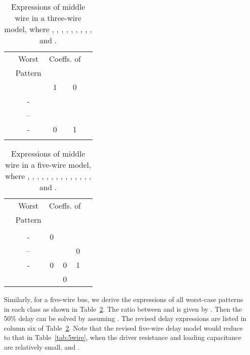 \documentclass[10pt,journal]{IEEEtran}
\begin{document}
\begin{table}[!t]
\caption{Expressions of middle wire in a three-wire model, where , , , ,  ,  , , , , and .} \label{tab:3dif}
\begin{center}
\begin{tabular}{|c|c|c|c|c|}
\hline
\multirow{2}{*}{} & Worst & \multicolumn{2}{|c|}{Coeffs. of } & \multirow{2}{*}{}\\
\cline{3-4}
& Pattern &  &  & \\
\hline
 &  & 1 & 0 &  \\
\hline
 & - &  &  &  \\
\hline
 & -- &  &  &  \\
\hline
 & - & 0 & 1 &  \\
\hline
 &  &  &  &  \\
\hline
\end{tabular}
\end{center}
\end{table}


\begin{table}[!t]
\caption{Expressions of middle wire in a five-wire model, where , , , , ,  , ,  , , , , , , , and .} \label{tab:5dif}
\begin{center}
\begin{tabular}{|c|c|c|c|c|c|}
\hline
\multirow{2}{*}{} & Worst & \multicolumn{3}{|c|}{Coeffs. of } & \multirow{2}{*}{}\\
\cline{3-5}
& Pattern &  &  &  & \\
\hline
 &  &  &  &  &  \\
\hline
 & - & 0 &  &  &  \\
\hline
 & -- &  &  & 0 &  \\
\hline
 & - & 0 & 0 & 1 &  \\
\hline
 &  &  & 0 &  &  \\
\hline
\end{tabular}
\end{center}
\end{table}



Similarly, for a five-wire bus, we derive the expressions of all worst-case patterns in each class as shown in Table~\ref{tab:5dif}.
The ratio between  and  is given by . Then the 50\% delay can be solved by assuming . The revised delay expressions are listed in column six of Table~\ref{tab:5dif}.
Note that the revised five-wire delay model would reduce to that in Table~\ref{tab:5wire}, when the driver resistance and loading capacitance are relatively small,  and .
\end{document}
